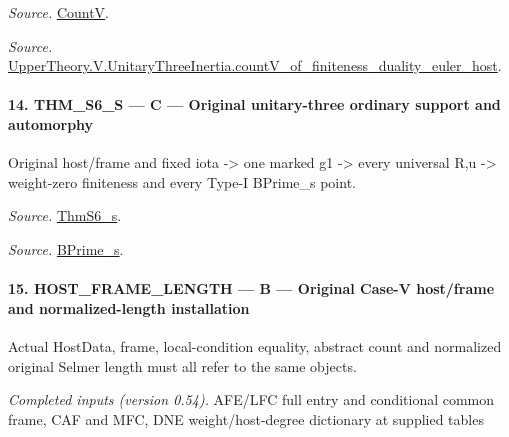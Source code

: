\documentclass[11pt,a4paper]{article}
\numberwithin{equation}{section}
\theoremstyle{remark}\newtheorem{remark}[theorem]{Remark}
\begin{document}
\emph{Source.} \href{https://github.com/CocoSgt/riemann-hypothesis-lean/blob/7cbf7a0c32fca1badf05931879a37c3f8a2b03b4/src/Development/AutomorphicArithmetic/AutomorphicVarieties/HeightAndVanishing/Counts.lean#L69-L69}{CountV}.

\emph{Source.} \href{https://github.com/CocoSgt/riemann-hypothesis-lean/blob/7cbf7a0c32fca1badf05931879a37c3f8a2b03b4/src/Development/AutomorphicArithmetic/AutomorphicVarieties/ModularityArgument/ThresholdArguments/DenseThresholdCases/CountVOf.lean#L33-L60}{UpperTheory.V.UnitaryThreeInertia.countV\_\allowbreak of\_\allowbreak finiteness\_\allowbreak duality\_\allowbreak euler\_\allowbreak host}.



\paragraph{14. THM\_\allowbreak S6\_\allowbreak S — C — Original unitary-three ordinary support and automorphy}

Original host/frame and fixed iota -> one marked g1 -> every universal R,u -> weight-zero finiteness and every Type-I BPrime\_\allowbreak s point.

\emph{Source.} \href{https://github.com/CocoSgt/riemann-hypothesis-lean/blob/7cbf7a0c32fca1badf05931879a37c3f8a2b03b4/src/Development/AutomorphicArithmetic/AutomorphicVarieties/ModularityArgument/ThresholdArguments/DenseThresholdCases/ThmS6CoreS.lean#L17-L26}{ThmS6\_\allowbreak s}.

\emph{Source.} \href{https://github.com/CocoSgt/riemann-hypothesis-lean/blob/7cbf7a0c32fca1badf05931879a37c3f8a2b03b4/src/Development/AutomorphicArithmetic/AutomorphicVarieties/ModularityArgument/ThresholdArguments/DenseThresholdCases/ThmS6CoreS.lean#L12-L16}{BPrime\_\allowbreak s}.



\paragraph{15. HOST\_\allowbreak FRAME\_\allowbreak LENGTH — B — Original Case-V host/frame and normalized-length installation}

Actual HostData, frame, local-condition equality, abstract count and normalized original Selmer length must all refer to the same objects.

\emph{Completed inputs (version 0.54).} AFE/LFC full entry and conditional common frame, CAF and MFC, DNE weight/host-degree dictionary at supplied tables
\end{document}
